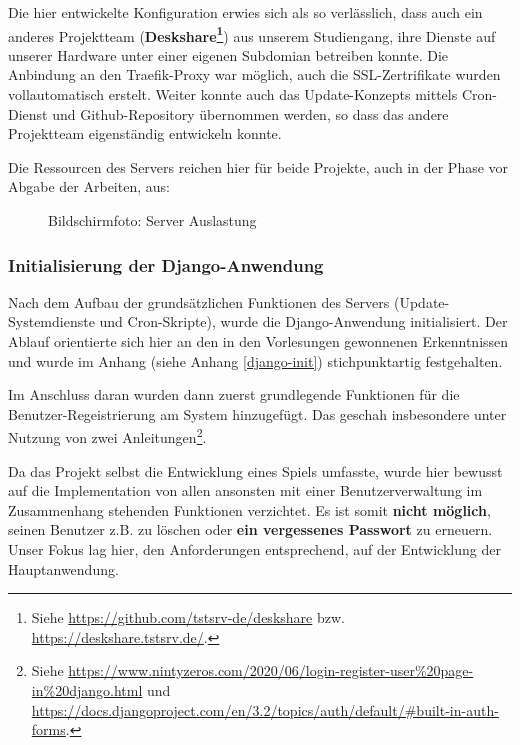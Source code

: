 Die hier entwickelte Konfiguration erwies sich als so verlässlich, dass auch ein anderes Projektteam (\textbf{Deskshare\footnote{Siehe \url{https://github.com/tstsrv-de/deskshare} bzw. \url{https://deskshare.tstsrv.de/}.}}) aus unserem Studiengang, ihre Dienste auf unserer Hardware unter einer eigenen Subdomian betreiben konnte. Die Anbindung an den Traefik-Proxy war möglich, auch die SSL-Zertrifikate wurden vollautomatisch erstelt. Weiter konnte auch das Update-Konzepts mittels Cron-Dienst und Github-Repository übernommen werden, so dass das andere Projektteam eigenständig entwickeln konnte. 


Die Ressourcen des Servers reichen hier für beide Projekte, auch in der Phase vor Abgabe der Arbeiten, aus: 

\begin{figure}[H]
    \centering
    \label{fig:henning-server-auslastung}
    \caption{Bildschirmfoto: Server Auslastung}
\end{figure}






\subsubsection{Initialisierung der Django-Anwendung}

Nach dem Aufbau der grundsätzlichen Funktionen des Servers (Update-Systemdienste und Cron-Skripte), wurde die Django-Anwendung initialisiert. Der Ablauf orientierte sich hier an den in den Vorlesungen gewonnenen Erkenntnissen und wurde im Anhang (siehe Anhang \ref{django-init}) stichpunktartig festgehalten. 

Im Anschluss daran wurden dann zuerst grundlegende Funktionen für die Benutzer-Regeistrierung am System hinzugefügt. Das geschah insbesondere unter Nutzung von zwei Anleitungen\footnote{Siehe  \url{https://www.nintyzeros.com/2020/06/login-register-user\%20page-in\%20django.html} und \url{https://docs.djangoproject.com/en/3.2/topics/auth/default/\#built-in-auth-forms}.}.


Da das Projekt selbst die Entwicklung eines Spiels umfasste, wurde hier bewusst auf die Implementation von allen ansonsten mit einer Benutzerverwaltung im Zusammenhang stehenden Funktionen verzichtet. Es ist somit \textbf{nicht möglich}, seinen Benutzer z.B. zu löschen oder \textbf{ein vergessenes Passwort} zu erneuern. Unser Fokus lag hier, den Anforderungen entsprechend, auf der Entwicklung der Hauptanwendung. 

